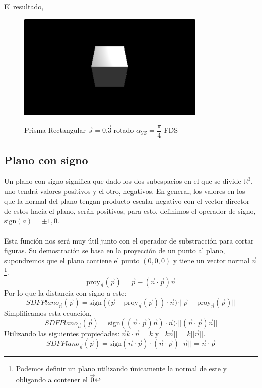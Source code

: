 El resultado,
\begin{figure}[H]
  \centering
  \captionsetup{justification=centering}%
  \includegraphics[width=0.8\textwidth]{secciones/imagenes/sdf_prisma_rect.jpeg}\label{fig:prisma}
  \caption{Prisma Rectangular \(\Vec{s}=\Vec{0.3}\) rotado \(\alpha_{YZ}=\dfrac{\pi}{4}\) FDS}
\end{figure}

\subsection{Plano con signo}
Un plano con signo significa que dado los dos subespacios en el que se divide \(\mathbb{R}^3\), uno tendrá valores positivos y el otro, negativos. En general, los valores en los que la normal del plano tengan producto escalar negativo con el vector director de estos hacia el plano, serán positivos, para esto, definimos el operador de signo, \(\text{sign}(a)=\pm 1, 0\).\\\\
Esta función nos será muy útil junto con el operador de substracción para cortar figuras. Su demostración se basa en la proyección de un punto al plano, supondremos que el plano contiene el punto \((0,0,0)\) y tiene un vector normal \(\Vec{n}\) \footnote{Podemos definir un plano utilizando únicamente la normal de este y obligando a contener el \(\Vec{0}\)}.
\[\text{proy}_{\Vec{n}}(\Vec{p}) = \Vec{p} - (\Vec{n}\cdot\Vec{p})\Vec{n} \]
Por lo que la distancia con signo a este:
\[ SDFPlano_{\Vec{n}}(\Vec{p})=\text{sign}\left((\Vec{p}-\text{proy}_{\Vec{n}}(\Vec{p})\right) \cdot \Vec{n})\cdot \vert \vert \Vec{p} - \text{proy}_{\Vec{n}}(\Vec{p}) \vert\vert \]
Simplificamos esta ecuación,
\[ SDFPlano_{\Vec{n}}(\Vec{p}) = \text{sign}\left((\Vec{n}\cdot\Vec{p})\Vec{n}\right) \cdot \Vec{n})\cdot \vert \vert (\Vec{n}\cdot\Vec{p})\Vec{n}  \vert\vert \]
Utilizando las siguientes propiedades: \(\Vec{n}k\cdot\Vec{n}=k\) y \(\vert\vert k\Vec{n}\vert\vert=k\vert\vert\Vec{n}\vert\vert\).
\[ SDFPlano_{\Vec{n}}(\Vec{p})=\text{sign}\left(\Vec{n}\cdot\Vec{p}\right)\cdot (\Vec{n}\cdot\Vec{p}) \vert \vert\Vec{n}\vert\vert=\Vec{n}\cdot\Vec{p}\]

